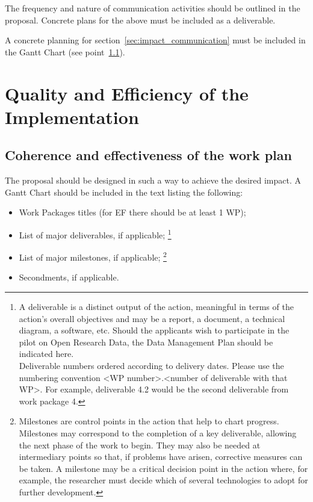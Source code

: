 \medskip\noindent
The frequency and nature of communication activities should be outlined in the proposal.
Concrete plans for the above must be included as a deliverable.

\medskip\noindent
A concrete planning for section~\ref{sec:impact_communication} must be included in the Gantt Chart (see point~\ref{sec:implementation_work_plan}).




\newpage
\section{Quality and Efficiency of the Implementation}
\label{sec:implementation}

\subsection{Coherence and effectiveness of the work plan}
\label{sec:implementation_work_plan}

The proposal should be designed in such a way to achieve the desired impact. 
A Gantt Chart should be included in the text listing the following:

\begin{itemize}
  \item Work Packages titles (for EF there should be at least 1 WP); 
  \item List of major deliverables, if applicable;%
  \footnote{A deliverable is a distinct output of the action, meaningful in terms of the action's overall objectives and may be a report, a document, a technical diagram, a software, etc.
  Should the applicants wish to participate in the pilot on Open Research Data, the Data Management Plan should be indicated here.\\
  Deliverable numbers ordered according to delivery dates. 
  Please use the numbering convention <WP number>.<number of deliverable with that WP>. 
  For example, deliverable 4.2 would be the second deliverable from work package 4.}
  \item List of major milestones, if applicable;%
  \footnote{Milestones are control points in the action that help to chart progress. 
  Milestones may correspond to the completion of a key deliverable, allowing the next phase of the work to begin.
  They may also be needed at intermediary points so that, if problems have arisen, corrective measures can be taken. 
  A milestone may be a critical decision point in the action where, for example, the researcher must decide which of several technologies to adopt for further development.}
  \item Secondments, if applicable.
\end{itemize}

